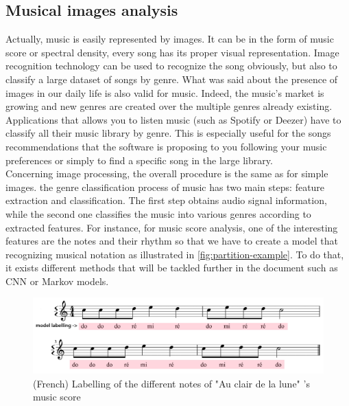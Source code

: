 \documentclass[11pt, openany]{report}
\theoremstyle{plain}
\theoremstyle{definition}
\theoremstyle{remark}
\begin{document}
\subsection{Musical images analysis}
Actually, music is easily represented by images. It can be in the form of music score or spectral density, every song has its proper visual representation. Image recognition technology can be used to recognize the song obviously, but also to classify a large dataset of songs by genre. What was said about the presence of images in our daily life is also valid for music. Indeed, the music's market is growing and new genres are created over the multiple genres already existing. Applications that allows you to listen music (such as Spotify or Deezer) have to classify all their music library by genre. This is especially useful for the songs recommendations that the software is proposing to you following your music preferences or simply to find a specific song in the large library. \\ 

Concerning image processing, the overall procedure is the same as for simple images. the genre classification process of music has two main steps: feature extraction and classification. The first step obtains audio signal information, while the second one classifies the music into various genres according to extracted features. For instance, for music score analysis, one of the interesting features are the notes and their rhythm so that we have to create a model that recognizing musical notation as illustrated in \autoref{fig:partition-example}. To do that, it exists different methods that will be tackled further in the document such as CNN or Markov models. 

\begin{figure}[h]
  \centering
  \includegraphics[scale=0.18]{figures/partition-example.jpg}
  \caption{(French) Labelling of the different notes of "Au clair de la lune" 's music score}
  \label{fig:partition-example}
\end{figure}
  
\end{document}
